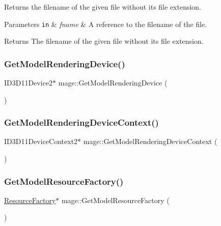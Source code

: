 Returns the filename of the given file without its file extension.


\begin{DoxyParams}[1]{Parameters}
\mbox{\tt in}  & {\em fname} & A reference to the filename of the file. \\
\hline
\end{DoxyParams}
\begin{DoxyReturn}{Returns}
The filename of the given file without its file extension. 
\end{DoxyReturn}
\hypertarget{namespacemage_aca16dcb4637f074bb6e33d4ba7929686}{}\label{namespacemage_aca16dcb4637f074bb6e33d4ba7929686} 
\subsubsection{\texorpdfstring{Get\+Model\+Rendering\+Device()}{GetModelRenderingDevice()}}
{\footnotesize\ttfamily I\+D3\+D11\+Device2$\ast$ mage\+::\+Get\+Model\+Rendering\+Device (\begin{DoxyParamCaption}{ }\end{DoxyParamCaption})}

\hypertarget{namespacemage_a1d373a08e09ec19944bf23feb4688b7e}{}\label{namespacemage_a1d373a08e09ec19944bf23feb4688b7e} 
\subsubsection{\texorpdfstring{Get\+Model\+Rendering\+Device\+Context()}{GetModelRenderingDeviceContext()}}
{\footnotesize\ttfamily I\+D3\+D11\+Device\+Context2$\ast$ mage\+::\+Get\+Model\+Rendering\+Device\+Context (\begin{DoxyParamCaption}{ }\end{DoxyParamCaption})}

\hypertarget{namespacemage_a51b4df46661a9038c0d2a14cb3fbe483}{}\label{namespacemage_a51b4df46661a9038c0d2a14cb3fbe483} 
\subsubsection{\texorpdfstring{Get\+Model\+Resource\+Factory()}{GetModelResourceFactory()}}
{\footnotesize\ttfamily \hyperlink{classmage_1_1_resource_factory}{Resource\+Factory}$\ast$ mage\+::\+Get\+Model\+Resource\+Factory (\begin{DoxyParamCaption}{ }\end{DoxyParamCaption})}

